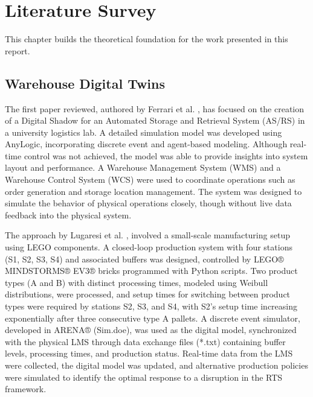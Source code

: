 \chapter{Literature Survey}
\label{chap:literature_survey}


This chapter builds the theoretical foundation for the work presented in this report.  

\section{Warehouse Digital Twins}
\label{sec:Warehouse DT}

The first paper reviewed, authored by Ferrari et al. \cite{Ferrari2022}, has focused on the creation 
of a Digital Shadow for an Automated Storage and Retrieval System (AS/RS) in a university
logistics lab. A detailed simulation model was developed using AnyLogic, incorporating 
discrete event and agent-based modeling. Although real-time control was not achieved, the 
model was able to provide insights into system layout and performance. A Warehouse Management 
System (WMS) and a Warehouse Control System (WCS) were used to coordinate operations such as 
order generation and storage location management. The system was designed to simulate the behavior 
of physical operations closely, though without live data feedback into the physical system. 

The approach by Lugaresi et al. \cite{Lugaresi2019}, involved a small-scale manufacturing setup using LEGO components.
A closed-loop production system with four stations (S1, S2, S3, S4) and associated buffers was designed,
controlled by LEGO® MINDSTORMS® EV3® bricks programmed with Python scripts. Two product types (A and B) 
with distinct processing times, modeled using Weibull distributions, were processed, and setup times for 
switching between product types were required by stations S2, S3, and S4, with S2’s setup time increasing 
exponentially after three consecutive type A pallets. A discrete event simulator, developed in ARENA® (Sim.doe), 
was used as the digital model, synchronized with the physical LMS through data exchange files (*.txt) containing 
buffer levels, processing times, and production status. Real-time data from the LMS were collected, the digital 
model was updated, and alternative production policies were simulated to identify the optimal response to a disruption
in the RTS framework.


